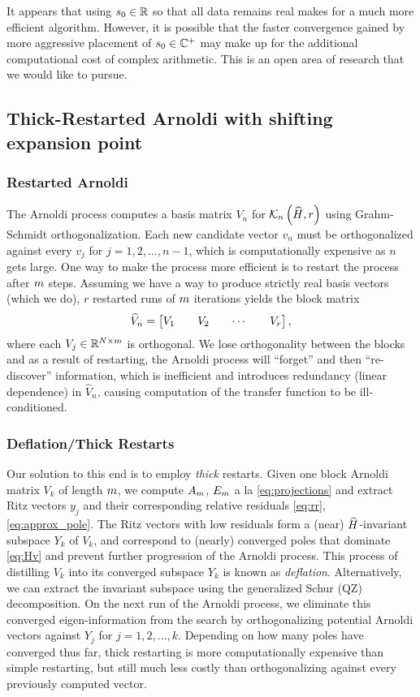 \documentclass[letterpaper]{article}
\theoremstyle{remark}
\begin{document}
\begin{description}
   It appears that using $s_0\in\mathbb{R}$ so that all data remains real makes for a 
   much more 
   efficient algorithm.  However, it is possible that the faster convergence gained
   by more aggressive placement of $s_0\in\mathbb{C}^+$  may make up for the 
   additional computational cost of complex arithmetic.  This is an open area 
   of research that we would like to pursue. 

   \subsection{Thick-Restarted Arnoldi with shifting expansion point}
   \subsubsection{Restarted Arnoldi}
   The Arnoldi process computes a basis matrix $V_n$ for $\mathcal{K}_{n}\left({\widehat{H}},{r} \right)$
   using Grahm-Schmidt orthogonalization. Each new candidate vector $v_n$ must
   be orthogonalized against every $v_j$ for $j=1,2,...,n-1$, which is computationally 
   expensive
   as $n$ gets large. One way to make the process more efficient is to 
   restart the process after $m$ steps.  Assuming we have a way to produce
   strictly real basis vectors (which we do), $r$ restarted runs of $m$ 
   iterations yields the block matrix 
   \[
   \widehat{V}_n = \begin{bmatrix} V_1 && V_2 && \cdots && V_r\end{bmatrix},
   \]
   where each $V_j\in\mathbb{R}^{N\times m}$ is orthogonal. We lose orthogonality 
   between the blocks and as a result of restarting, the Arnoldi process will
   ``forget'' and then ``re-discover'' information, which is inefficient 
   and introduces redundancy (linear dependence) in $\widehat{V}_n$, causing
   computation of the transfer function to be ill-conditioned.
   
   \subsubsection{Deflation/Thick Restarts}
   Our solution to this end is to employ \emph{thick} restarts. Given one 
   block Arnoldi matrix $V_k$ of length $m$, we compute $A_m$, $E_m$ a la 
   \eqref{eq:projections} and extract Ritz vectors $y_j$ and their
   corresponding relative residuals \eqref{eq:rr}, \eqref{eq:approx_pole}. 
   The Ritz vectors with low residuals form a (near) $\widehat{H}$-invariant 
   subspace $Y_k$ of $V_k$, and correspond to (nearly) converged poles 
   that dominate \eqref{eq:Hv} and prevent further progression of the
   Arnoldi process.  This process of distilling $V_k$ into its converged 
   subspace $Y_k$ is known as \emph{deflation}.   
   Alternatively, we can extract the invariant subspace 
   using the generalized Schur (QZ) decomposition.  On the next run 
   of the Arnoldi process, we eliminate this converged eigen-information
   from the search by orthogonalizing potential Arnoldi vectors against 
   $Y_j$ for $j=1,2,...,k$.  Depending on how many poles have converged thus
   far, thick restarting is more computationally expensive than 
   simple restarting, but still much less costly than orthogonalizing against 
   every previously computed vector.
   

\end{description}
\end{document}
